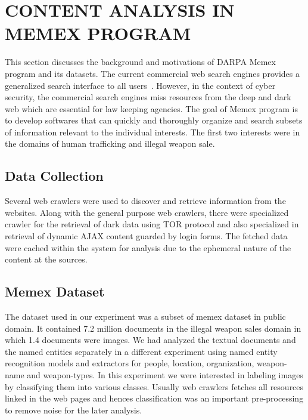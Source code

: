 \section{CONTENT ANALYSIS IN MEMEX PROGRAM} \label{sec:memex}
This section discusses the background and motivations of DARPA Memex program and its datasets. The current commercial web search engines provides a generalized search interface to all users~\cite{}. However, in the context of cyber security, the commercial search engines miss resources from the deep and dark web which are essential for law keeping agencies. The goal of Memex program is to develop softwares that can quickly and thoroughly organize and search subsets of information relevant to the individual interests. The first two interests were in the domains of human trafficking and illegal weapon sale.

\subsection{Data Collection}
\label{sec:memex-datacollection}
Several web crawlers were used to discover and retrieve information from the websites.
Along with the general purpose web crawlers, there were specialized crawler for the retrieval of dark data using TOR protocol \cite{} and also specialized in retrieval of dynamic AJAX content guarded by login forms. The fetched data were cached within the system for analysis due to the ephemeral nature of the content at the sources.

\subsection{Memex Dataset} \label{sec:memex-dataset}
The dataset used in our experiment was a subset of memex dataset in public domain. It contained 7.2 million documents in the illegal weapon sales domain in which 1.4 documents were images. We had analyzed the textual documents and the named entities separately in a different experiment using named entity recognition models and extractors for people, location, organization, weapon-name and weapon-types. In this experiment we were interested in labeling images by classifying them into various classes. Usually web crawlers fetches all resources linked in the web pages and hences classification was an important pre-processing to remove noise for the later analysis.

